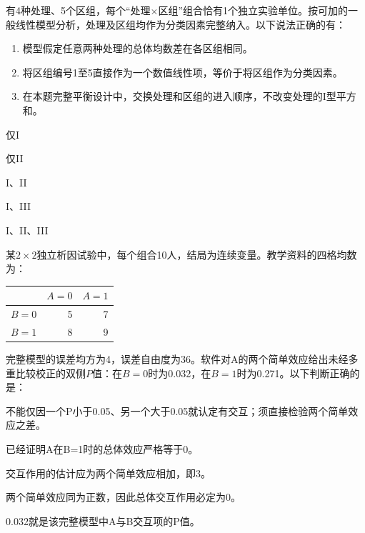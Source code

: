 \par\noindent\begin{minipage}{\linewidth}
有4种处理、5个区组，每个“处理\(\times\)区组”组合恰有1个独立实验单位。按可加的一般线性模型分析，处理及区组均作为分类因素完整纳入。以下说法正确的有：
\begin{enumerate}\renewcommand{\labelenumi}{\Roman{enumi}.}
\item 模型假定任意两种处理的总体均数差在各区组相同。
\item 将区组编号1至5直接作为一个数值线性项，等价于将区组作为分类因素。
\item 在本题完整平衡设计中，交换处理和区组的进入顺序，不改变处理的I型平方和。
\end{enumerate}
\begin{choices}
\item 仅I
\item 仅II
\item I、II
\item I、III
\item I、II、III
\end{choices}
\end{minipage}\par\medskip

\par\noindent\begin{minipage}{\linewidth}
某\(2\times2\)独立析因试验中，每个组合10人，结局为连续变量。教学资料的四格均数为：
\begin{center}\begin{tabular}{lrr}
\toprule &\(A=0\)&\(A=1\)\\\midrule
\(B=0\)&5&7\\
\(B=1\)&8&9\\\bottomrule
\end{tabular}\end{center}
完整模型的误差均方为4，误差自由度为36。软件对A的两个简单效应给出未经多重比较校正的双侧\(P\)值：在\(B=0\)时为0.032，在\(B=1\)时为0.271。以下判断正确的是：
\begin{choices}
\item 不能仅因一个P小于0.05、另一个大于0.05就认定有交互；须直接检验两个简单效应之差。
\item 已经证明A在B=1时的总体效应严格等于0。
\item 交互作用的估计应为两个简单效应相加，即3。
\item 两个简单效应同为正数，因此总体交互作用必定为0。
\item 0.032就是该完整模型中A与B交互项的P值。
\end{choices}
\end{minipage}\par\medskip

